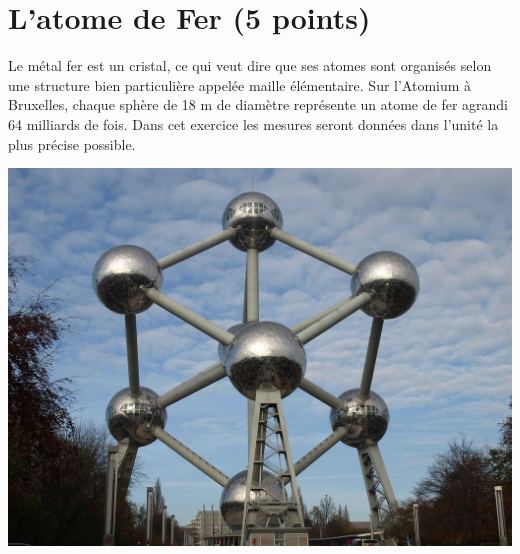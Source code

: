 \section{L'atome de Fer (5 points)}\label{ex:fer}

\begin{multicols}{2}
	
	
	Le métal fer est un cristal, ce qui veut dire que ses atomes sont organisés selon une structure bien particulière appelée maille élémentaire. Sur l'Atomium à Bruxelles, chaque sphère de 18 m de diamètre représente un atome de fer agrandi 64 milliards de fois. Dans cet exercice les mesures seront données dans l'unité la plus précise possible.
	
	\includegraphics[scale=0.5]{img/atomium}
\end{multicols}


